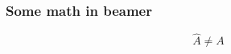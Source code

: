 \documentclass{beamer}
\begin{document}
\begin{frame}
  \frametitle{Some math in beamer}
  \begin{equation}
    \label{eq:1}
    \hat A \neq A
  \end{equation}
\end{frame}
\end{document}
